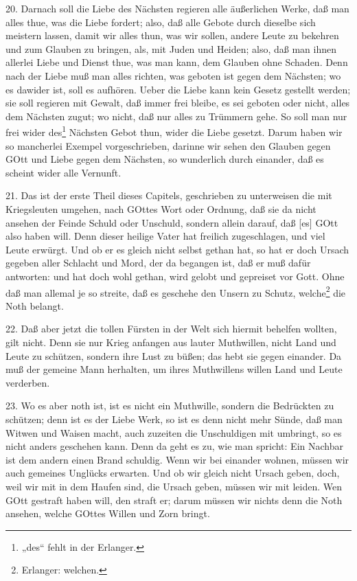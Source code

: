 20. Darnach soll die Liebe des Nächsten regieren alle äußerlichen Werke, daß man alles thue, was die Liebe fordert; also, daß alle Gebote durch dieselbe sich meistern lassen, damit wir alles thun, was wir sollen, andere Leute zu bekehren und zum Glauben zu bringen, als, mit Juden und Heiden; also, daß man ihnen allerlei Liebe und Dienst thue, was man kann, dem Glauben ohne Schaden. Denn nach der Liebe muß man alles richten, was geboten ist gegen dem Nächsten; wo es dawider ist, soll es aufhören. Ueber die Liebe kann kein Gesetz gestellt werden; sie soll regieren mit Gewalt, daß immer frei bleibe, es sei geboten oder nicht, alles dem Nächsten zugut; wo nicht, daß nur alles zu Trümmern gehe. So soll man nur frei wider des\footnote{„des“ fehlt in der Erlanger.} Nächsten Gebot thun, wider die Liebe gesetzt. Darum haben wir so mancherlei Exempel vorgeschrieben, darinne wir sehen den Glauben gegen GOtt und Liebe gegen dem Nächsten, so wunderlich durch einander, daß es scheint wider alle Vernunft.

21. Das ist der erste Theil dieses Capitels, geschrieben zu unterweisen die mit Kriegsleuten umgehen, nach GOttes Wort oder Ordnung, daß sie da nicht ansehen der Feinde Schuld oder Unschuld, sondern allein darauf, daß [es] GOtt also haben will. Denn dieser heilige Vater hat freilich zugeschlagen, und viel Leute erwürgt. Und ob er es gleich nicht selbst gethan hat, so hat er doch Ursach gegeben aller Schlacht und Mord, der da begangen ist, daß er muß dafür antworten: und hat doch wohl gethan, wird gelobt und gepreiset vor Gott. Ohne daß man allemal je so streite, daß es geschehe den Unsern zu Schutz, welche\footnote{Erlanger: welchen.} die Noth belangt.

22. Daß aber jetzt die tollen Fürsten in der Welt sich hiermit behelfen wollten, gilt nicht. Denn sie nur Krieg anfangen aus lauter Muthwillen, nicht Land und Leute zu schützen, sondern ihre Lust zu büßen; das hebt sie gegen einander. Da muß der gemeine Mann herhalten, um ihres Muthwillens willen Land und Leute verderben.

23. Wo es aber noth ist, ist es nicht ein Muthwille, sondern die Bedrückten zu schützen; denn ist es der Liebe Werk, so ist es denn nicht mehr Sünde, daß man Witwen und Waisen macht, auch zuzeiten die Unschuldigen mit umbringt, so es nicht anders geschehen kann. Denn da geht es zu, wie man spricht: Ein Nachbar ist dem andern einen Brand schuldig. Wenn wir bei einander wohnen, müssen wir auch gemeines Unglücks erwarten. Und ob wir gleich nicht
Ursach geben, doch, weil wir mit in dem Haufen sind, die Ursach geben, müssen wir mit leiden. Wen GOtt gestraft haben will, den straft er; darum müssen wir nichts denn die Noth ansehen, welche GOttes Willen und Zorn bringt.

